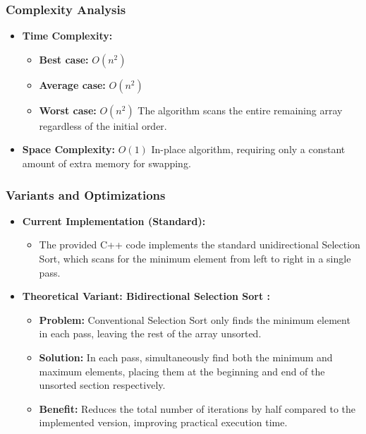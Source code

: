     \subsubsection{Complexity Analysis}
        \begin{itemize}
            \item \textbf{Time Complexity:}
            \begin{itemize}
                \item \textbf{Best case:} $O(n^2)$
                \item \textbf{Average case:} $O(n^2)$
                \item \textbf{Worst case:} $O(n^2)$ 
                    \subitem The algorithm scans the entire remaining array regardless of the initial order.
            \end{itemize}
            \item \textbf{Space Complexity:} $O(1)$ 
                \subitem In-place algorithm, requiring only a constant amount of extra memory for swapping.
        \end{itemize}
   \subsubsection{Variants and Optimizations}
        \begin{itemize}
            \item \textbf{Current Implementation (Standard):} 
            \begin{itemize}
                \item The provided C++ code implements the standard unidirectional Selection Sort, which scans for the minimum element from left to right in a single pass.
            \end{itemize}
            \item \textbf{Theoretical Variant: Bidirectional Selection Sort \cite{alnihoud2010enhancement}:}
            \begin{itemize}
                \item \textbf{Problem:} Conventional Selection Sort only finds the minimum element in each pass, leaving the rest of the array unsorted.
                \item \textbf{Solution:} In each pass, simultaneously find both the minimum and maximum elements, placing them at the beginning and end of the unsorted section respectively.
                \item \textbf{Benefit:} Reduces the total number of iterations by half compared to the implemented version, improving practical execution time.
            \end{itemize}
        \end{itemize}
